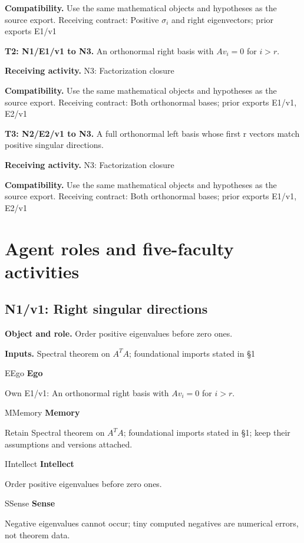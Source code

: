 \documentclass[preprint,12pt,aps,pra,showkeys,amsmath,amssymb,superscriptaddress,floatfix]{revtex4-2}
\theoremstyle{definition}
\theoremstyle{remark}
\newcommand{\mmfaculty}[3]{%
 \begin{mmfacultybox}{#1}{#2}
 {\sffamily\bfseries\color{MMBlue}#2}\par\smallskip #3
 \end{mmfacultybox}}
\newcommand{\field}[2]{\par\smallskip\noindent\textbf{#1.} #2\par}
\begin{document}
\field{Compatibility}{Use the same mathematical objects and hypotheses as the source export.
Receiving contract: Positive \(\sigma _i\) and right eigenvectors; prior
exports E1/v1}

\field{T2: N1/E1/v1 to N3}{An orthonormal right basis with \(Av_i=0\) for \(i>r\).}

\field{Receiving activity}{N3: Factorization closure}

\field{Compatibility}{Use the same mathematical objects and hypotheses as the source export.
Receiving contract: Both orthonormal bases; prior exports E1/v1, E2/v1}

\field{T3: N2/E2/v1 to N3}{A full orthonormal left basis whose first r vectors match positive
singular directions.}

\field{Receiving activity}{N3: Factorization closure}

\field{Compatibility}{Use the same mathematical objects and hypotheses as the source export.
Receiving contract: Both orthonormal bases; prior exports E1/v1, E2/v1}

\endgroup

\clearpage\section{Agent roles and five-faculty activities}\begingroup\small\linespread{1.05}\selectfont{}

\subsection{N1/v1: Right singular directions}

\field{Object and role}{Order positive eigenvalues before zero ones.}

\field{Inputs}{Spectral theorem on \(A^{T}A\); foundational imports stated in §1}

\mmfaculty{E}{Ego}{Own E1/v1: An orthonormal right basis with \(Av_i=0\) for \(i>r\).}

\mmfaculty{M}{Memory}{Retain Spectral theorem on \(A^{T}A\); foundational imports stated in
§1; keep their assumptions and versions attached.}

\mmfaculty{I}{Intellect}{Order positive eigenvalues before zero ones.}

\mmfaculty{S}{Sense}{Negative eigenvalues cannot occur; tiny computed negatives are numerical
errors, not theorem data.}
\end{document}
